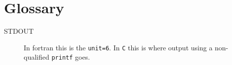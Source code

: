 \section{Glossary}

\begin{description}

\item [STDOUT] \label{glos:STDOUT} In fortran this is the {\tt unit=6}.  In {\tt C} this is where output
using a non-qualified {\tt printf} goes.

\end{description}











